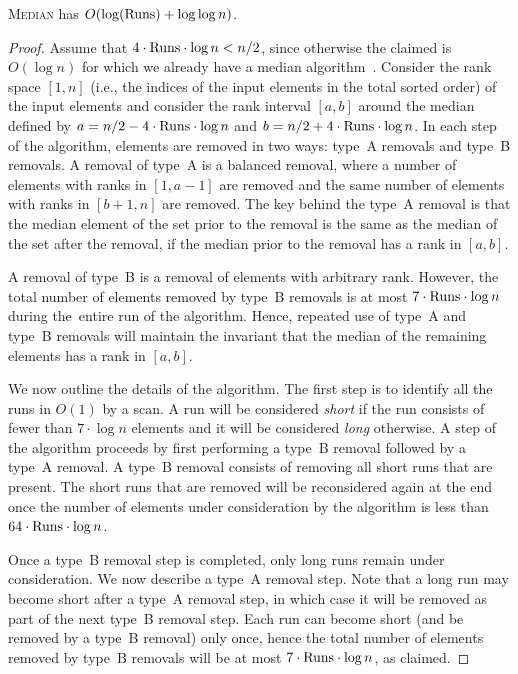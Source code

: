 \begin{theorem}
\textsc{Median} has \frag $O(\log (\mathrm{Runs}) + \log\log n)$.
\end{theorem}
\begin{proof}
Assume that $4 \cdot \mathrm{Runs} \cdot \log n < n/2$, since otherwise the
claimed \frag is $O(\log n)$ for which we already have a median
algorithm~\cite{afshani:fragile-ESA19}. Consider the rank space
$[1,n]$ (i.e., the indices of the input elements in the total sorted
order) of the input elements and consider the rank interval $[a,b]$
around the median defined by $a = n/2 - 4 \cdot \mathrm{Runs} \cdot \log n$
and $b = n/2 + 4 \cdot \mathrm{Runs} \cdot \log n$. In each step of the
algorithm, elements are removed in two ways: type~A removals and
type~B removals. A removal of type~A is a balanced removal, where a
number of elements with ranks in $[1,a-1]$ are removed and the same
number of elements with ranks in $[b+1,n]$ are removed. The key
behind the type~A removal is that the median element of the set
prior to the removal is the same as the median of the set after the
removal, if the median prior to the removal has a rank in $[a,b]$.

A removal of type~B is a removal of elements with arbitrary
rank. However, the total number of elements removed by type~B removals
is at most $7 \cdot \mathrm{Runs} \cdot \log n$ during the\ entire run of the
algorithm. Hence, repeated use of type~A and type~B removals will
maintain the invariant that the median of the remaining elements has a
rank in $[a,b]$.

We now outline the details of the algorithm. The first step is to
identify all the runs in $O(1)$ \frag by a scan. A run will be
considered {\em short} if the run consists of fewer than
$7 \cdot \log n$ elements and it will be considered {\em long} otherwise. A
step of the algorithm proceeds by first performing a type~B removal
followed by a type~A removal.  A type~B removal consists of removing
all short runs that are present. The short runs that are removed will
be reconsidered again at the end once the number of elements under
consideration by the algorithm is less than
$64 \cdot \mathrm{Runs} \cdot \log n$.

Once a type~B removal step is completed, only long runs remain under
consideration.  We now describe a type~A removal step. Note that a
long run may become short after a type~A removal step, in which case
it will be removed as part of the next type~B removal step. Each run
can become short (and be removed by a type~B removal) only once, hence
the total number of elements removed by type~B removals will be at
most $7 \cdot \mathrm{Runs} \cdot \log n$, as claimed.


\end{proof}
